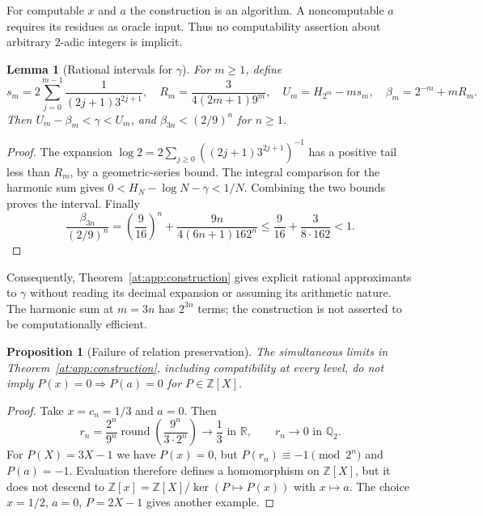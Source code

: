 \documentclass[11pt,a4paper]{article}
\newcommand{\Q}{\mathbb Q}
\newcommand{\R}{\mathbb R}
\newcommand{\Z}{\mathbb Z}
\newtheorem{proposition}[theorem]{Proposition}
\newtheorem{lemma}[theorem]{Lemma}
\theoremstyle{definition}
\theoremstyle{remark}
\numberwithin{equation}{section}
\begin{document}
For computable $x$ and $a$ the construction is an algorithm. A
noncomputable $a$ requires its residues as oracle input. Thus no
computability assertion about arbitrary $2$-adic integers is implicit.

\begin{lemma}[Rational intervals for $\gamma$]
\label{at:app:intervals}
For $m\ge1$, define
\begin{equation}
 s_m=2\sum_{j=0}^{m-1}\frac1{(2j+1)3^{2j+1}},\quad
 R_m=\frac3{4(2m+1)9^m},\quad
 U_m=H_{2^m}-ms_m,\quad \beta_m=2^{-m}+mR_m.
\end{equation}
Then $U_m-\beta_m<\gamma<U_m$, and $\beta_{3n}<(2/9)^n$ for $n\ge1$.
\end{lemma}
\begin{proof}
The expansion $\log2=2\sum_{j\ge0}((2j+1)3^{2j+1})^{-1}$ has a
positive tail less than $R_m$, by a geometric-series bound. The integral
comparison for the harmonic sum gives
$0<H_N-\log N-\gamma<1/N$. Combining the two bounds proves the interval.
Finally
\[
 \frac{\beta_{3n}}{(2/9)^n}
 =\left(\frac9{16}\right)^n+
 \frac{9n}{4(6n+1)162^n}
 \le\frac9{16}+\frac3{8\cdot162}<1.
\]
\end{proof}
Consequently, Theorem~\ref{at:app:construction} gives explicit rational
approximants to $\gamma$ without reading its decimal expansion or assuming
its arithmetic nature. The harmonic sum at $m=3n$ has $2^{3n}$ terms;
the construction is not asserted to be computationally efficient.

\begin{proposition}[Failure of relation preservation]
\label{at:app:counterexample}
The simultaneous limits in Theorem~\ref{at:app:construction}, including
compatibility at every level, do not imply
$P(x)=0\Rightarrow P(a)=0$ for $P\in\Z[X]$.
\end{proposition}
\begin{proof}
Take $x=c_n=1/3$ and $a=0$. Then
\[
 r_n=\frac{2^n}{9^n}\operatorname{round}\left(\frac{9^n}{3\cdot2^n}\right)
 \longrightarrow\frac13\text{ in }\R,
 \qquad r_n\longrightarrow0\text{ in }\Q_2.
\]
For $P(X)=3X-1$ we have $P(x)=0$, but
$P(r_n)\equiv-1\pmod{2^n}$ and $P(a)=-1$. Evaluation therefore
defines a homomorphism on $\Z[X]$, but it does not descend to
$\Z[x]=\Z[X]/\ker(P\mapsto P(x))$ with $x\mapsto a$.
The choice $x=1/2$, $a=0$, $P=2X-1$ gives another example.
\end{proof}
\end{document}
